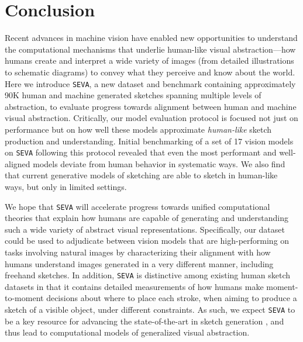 \documentclass{article}
\begin{document}
\section{Conclusion}
\vspace{-1 em}
Recent advances in machine vision have enabled new opportunities to understand the computational mechanisms that underlie human-like visual abstraction---how humans create and interpret a wide variety of images (from detailed illustrations to schematic diagrams) to convey what they perceive and know about the world. 
Here we introduce \texttt{SEVA}, a new dataset and benchmark containing approximately 90K human and machine generated sketches spanning multiple levels of abstraction, to evaluate progress towards alignment between human and machine visual abstraction. 
Critically, our model evaluation protocol is focused not just on performance but on how well these models approximate \textit{human-like} sketch production and understanding.
Initial benchmarking of a set of 17 vision models on \texttt{SEVA} following this protocol revealed that even the most performant and well-aligned models deviate from human behavior in systematic ways.
We also find that current generative models of sketching are able to sketch in human-like ways, but only in limited settings. 

We hope that \texttt{SEVA} will accelerate progress towards unified computational theories that explain how humans are capable of generating and understanding such a wide variety of abstract visual representations.
Specifically, our dataset could be used to adjudicate between vision models that are high-performing on tasks involving natural images \cite{mahmoud2023stress,golan2020controversial} by characterizing their alignment with how humans understand images generated in a very different manner, including freehand sketches. 
In addition, \texttt{SEVA} is distinctive among existing human sketch datasets in that it contains detailed measurements of how humans make moment-to-moment decisions about where to place each stroke, when aiming to produce a sketch of a visible object, under different constraints. 
As such, we expect \texttt{SEVA} to be a key resource for advancing the state-of-the-art in sketch generation \cite{qiu2022emergent,wang2021sketchembednet, vinker2022clipasso,ha2017neural,ribeiro2020sketchformer}, and thus lead to computational models of generalized visual abstraction. 
\end{document}
